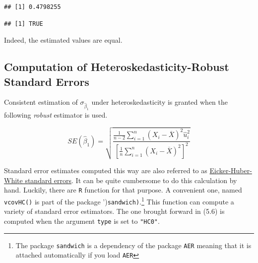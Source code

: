 \documentclass[]{book}
\newenvironment{Shaded}{\begin{snugshade}}{\end{snugshade}}
\newcommand{\KeywordTok}[1]{\textcolor[rgb]{0.13,0.29,0.53}{\textbf{#1}}}
\newcommand{\DecValTok}[1]{\textcolor[rgb]{0.00,0.00,0.81}{#1}}
\newcommand{\FloatTok}[1]{\textcolor[rgb]{0.00,0.00,0.81}{#1}}
\newcommand{\StringTok}[1]{\textcolor[rgb]{0.31,0.60,0.02}{#1}}
\newcommand{\CommentTok}[1]{\textcolor[rgb]{0.56,0.35,0.01}{\textit{#1}}}
\newcommand{\OperatorTok}[1]{\textcolor[rgb]{0.81,0.36,0.00}{\textbf{#1}}}
\newcommand{\NormalTok}[1]{#1}
\let\rmarkdownfootnote\footnote%
\def\footnote{\protect\rmarkdownfootnote}
\theoremstyle{definition}
\theoremstyle{definition}
\theoremstyle{definition}
\theoremstyle{remark}
\begin{document}
\begin{verbatim}
## [1] 0.4798255
\end{verbatim}

\begin{Shaded}
\end{Shaded}

\begin{verbatim}
## [1] TRUE
\end{verbatim}

Indeed, the estimated values are equal.

\subsection*{Computation of Heteroskedasticity-Robust Standard
Errors}\label{computation-of-heteroskedasticity-robust-standard-errors}

Consistent estimation of \(\sigma_{\hat{\beta}_1}\) under
heteroskedasticity is granted when the following \emph{robust} estimator
is used.

\[ SE(\hat{\beta}_1) = \sqrt{ \frac{ \frac{1}{n-2} \sum_{i=1}^n (X_i - \overline{X})^2 \hat{u}_i^2 }{ \left[ \frac{1}{n} \sum_{i=1}^n (X_i - \overline{X})^2  \right]^2} } \tag{5.6} \]

Standard error estimates computed this way are also referred to as
\href{https://en.wikipedia.org/wiki/Heteroscedasticity-consistent_standard_errors}{Eicker-Huber-White
standard errors}. It can be quite cumbersome to do this calculation by
hand. Luckily, there are \texttt{R} function for that purpose. A
convenient one, named \texttt{vcovHC()} is part of the package
')\texttt{sandwich\textquotesingle{})}.\footnote{The package
  \texttt{sandwich} is a dependency of the package \texttt{AER} meaning
  that it is attached automatically if you load \texttt{AER}} This
function can compute a variety of standard error estimators. The one
brought forward in (5.6) is computed when the argument \texttt{type} is
set to \texttt{"HC0"}.
\end{document}
